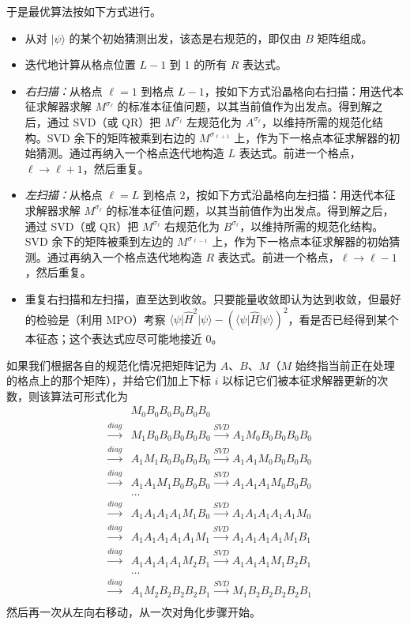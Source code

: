 \documentclass[a4paper,10pt,oneside,onecolumn,1p,times]{elsarticle}
\newcommand{\bra}[1]{\mbox{$\langle #1  |$}}
\newcommand{\ket}[1]{\mbox{$| #1  \rangle$}}
\begin{document}
于是最优算法按如下方式进行。
\begin{itemize}
\item 从对 $\ket{\psi}$ 的某个初始猜测出发，该态是右规范的，即仅由 $B$ 矩阵组成。
\item 迭代地计算从格点位置 $L-1$ 到 1 的所有 $R$ 表达式。
\item {\em 右扫描：}从格点 $\ell=1$ 到格点 $L-1$，按如下方式沿晶格向右扫描：用迭代本征求解器求解 $M^{\sigma_\ell}$ 的标准本征值问题，以其当前值作为出发点。得到解之后，通过 SVD（或 QR）把 $M^{\sigma_\ell}$ 左规范化为 $A^{\sigma_\ell}$，以维持所需的规范化结构。SVD 余下的矩阵被乘到右边的 $M^{\sigma_{\ell+1}}$ 上，作为下一格点本征求解器的初始猜测。通过再纳入一个格点迭代地构造 $L$ 表达式。前进一个格点，$\ell \rightarrow \ell+1$，然后重复。
\item {\em 左扫描：}从格点 $\ell=L$ 到格点 $2$，按如下方式沿晶格向左扫描：用迭代本征求解器求解 $M^{\sigma_\ell}$ 的标准本征值问题，以其当前值作为出发点。得到解之后，通过 SVD（或 QR）把 $M^{\sigma_\ell}$ 右规范化为 $B^{\sigma_\ell}$，以维持所需的规范化结构。SVD 余下的矩阵被乘到左边的 $M^{\sigma_{\ell-1}}$ 上，作为下一格点本征求解器的初始猜测。通过再纳入一个格点迭代地构造 $R$ 表达式。前进一个格点，$\ell \rightarrow \ell-1$，然后重复。
\item 重复右扫描和左扫描，直至达到收敛。只要能量收敛即认为达到收敛，但最好的检验是（利用 MPO）考察
$\bra{\psi} \hat{H}^2 \ket{\psi} - (\bra{\psi} \hat{H} \ket{\psi})^2$，看是否已经得到某个本征态；这个表达式应尽可能地接近 0。
\end{itemize}

如果我们根据各自的规范化情况把矩阵记为 $A$、$B$、$M$（$M$ 始终指当前正在处理的格点上的那个矩阵），并给它们加上下标 $i$ 以标记它们被本征求解器更新的次数，则该算法可形式化为
\begin{eqnarray*}
& & M_0 B_0 B_0 B_0 B_0 B_0 \\
&\stackrel{diag}{\rightarrow}& M_1 B_0 B_0 B_0 B_0 B_0
\stackrel{SVD}{\rightarrow} A_1 M_0 B_0 B_0 B_0 B_0 \\
&\stackrel{diag}{\rightarrow}& A_1 M_1 B_0 B_0 B_0 B_0
\stackrel{SVD}{\rightarrow} A_1 A_1 M_0 B_0 B_0 B_0 \\
&\stackrel{diag}{\rightarrow}& A_1 A_1 M_1 B_0 B_0 B_0
\stackrel{SVD}{\rightarrow} A_1 A_1 A_1 M_0 B_0 B_0 \\
& & \ldots \\
&\stackrel{diag}{\rightarrow}& A_1 A_1 A_1 A_1 M_1 B_0
\stackrel{SVD}{\rightarrow} A_1 A_1 A_1 A_1 A_1 M_0 \\
&\stackrel{diag}{\rightarrow}& A_1 A_1 A_1 A_1 A_1 M_1
\stackrel{SVD}{\rightarrow} A_1 A_1 A_1 A_1 M_1 B_1 \\
&\stackrel{diag}{\rightarrow}& A_1 A_1 A_1 A_1 M_2 B_1
\stackrel{SVD}{\rightarrow} A_1 A_1 A_1 M_1 B_2 B_1 \\
& & \ldots \\
&\stackrel{diag}{\rightarrow}& A_1 M_2 B_2 B_2 B_2 B_1
\stackrel{SVD}{\rightarrow} M_1 B_2 B_2 B_2 B_2 B_1 \\
\end{eqnarray*}
然后再一次从左向右移动，从一次对角化步骤开始。
\end{document}
